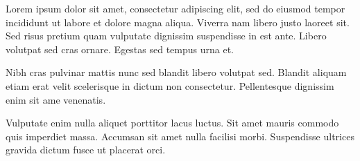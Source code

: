 Lorem ipsum dolor sit amet,
consectetur adipiscing elit, sed do
eiusmod tempor incididunt ut labore
et dolore magna aliqua. Viverra nam
libero justo laoreet sit. Sed risus
pretium quam vulputate dignissim
suspendisse in est ante. Libero
volutpat sed cras ornare. Egestas sed
tempus urna et.

Nibh cras pulvinar mattis nunc sed
blandit libero volutpat sed. Blandit
aliquam etiam erat velit scelerisque
in dictum non consectetur.
Pellentesque dignissim enim sit ame
venenatis.

Vulputate enim nulla aliquet
porttitor lacus luctus. Sit amet
mauris commodo quis imperdiet massa.
Accumsan sit amet nulla facilisi
morbi. Suspendisse ultrices gravida
dictum fusce ut placerat orci.
